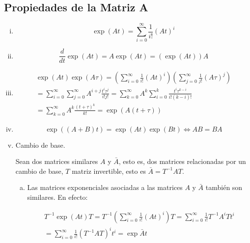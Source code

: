 \subsection{Propiedades de la Matriz A}
\begin{enumerate}[i)]
\item
\begin{equation}
\exp{(A t)} = \sum\limits_{i=0}^{\infty} \frac{1}{i!} (A t)^i
\end{equation}

\item
\begin{equation}
\frac{d}{dt} \exp{(A t)} = A \exp{(A t)} = (\exp{(A t)}) A
\end{equation}

\item

\begin{multline}
\exp{(At)} \exp{(A \tau)} = \left( \sum\limits_{i=0}^{\infty} \frac{1}{i!} (A t)^i \right) \left( \sum\limits_{j=0}^{\infty} \frac{1}{j!} (A \tau)^j \right) \\
= \sum\limits_{i=0}^{\infty} \sum\limits_{j=0}^{\infty} A^{i+j} \frac{t^i \tau^j}{i! j!} = \sum\limits_{k=0}^{\infty} A^k \sum\limits_{i=0}^{k} \frac{t^i \tau^{k-i}}{i! (k-i)!} \\
= \sum\limits_{k=0}^{\infty} A^k \frac{(t + \tau)^k}{k!} = \exp{(A(t + \tau))}
\end{multline}

\item
\begin{equation}
\exp{((A + B) t)} = \exp{(A t)} \exp{(B t)} \iff A B = B A
\end{equation}

\item Cambio de base.

Sean dos matrices similares $A$ y $\bar{A}$, esto es, dos matrices relacionadas por un cambio de base, $T$ matriz invertible, esto es $\bar{A} = T^{-1} A T$.

\begin{enumerate}[a)]
\item Las matrices exponenciales asociadas a las matrices $A$ y $\bar{A}$ también son similares. En efecto:

\begin{multline}
T^{-1} \exp{(At)} T = T^{-1} \left( \sum\limits_{i=0}^{\infty} \frac{1}{i!} (A t)^i \right) T = \sum\limits_{i=0}^{\infty} \frac{1}{i!} T^{-1} A^i T t^i \\
= \sum\limits_{i=0}^{\infty} \frac{1}{i!} (T^{-1} A T)^i t^i = \exp{\bar{A} t} \nonumber
\end{multline}


\end{enumerate}
\end{enumerate}
